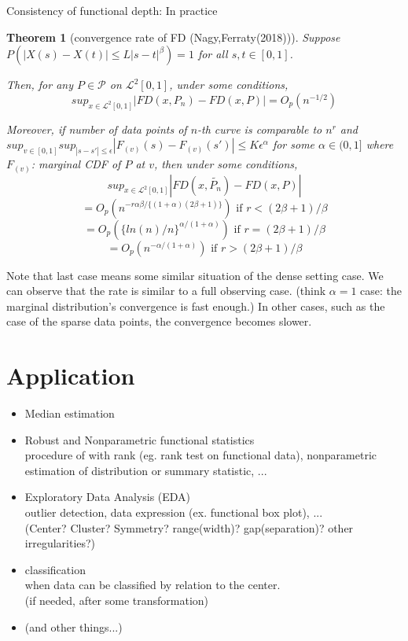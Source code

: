 \documentclass[aspectratio=169,ignorenonframetext,9pt]{beamer}
\theoremstyle{plain}
\newtheorem{thm}{Theorem}[section]
\theoremstyle{definition}
\begin{document}
\begin{frame}{Consistency of functional depth: In practice}
\begin{thm}[convergence rate of FD (Nagy,Ferraty(2018))]
    Suppose $P(|X(s)-X(t)|\leq L|s-t|^\beta)=1$ for all $s,t \in [0,1]$.

    Then, for any $P\in\mathcal{P}$ on $\mathcal{L}^2[0,1]$, under some conditions,
    \[sup_{x\in\mathcal{L}^2[0,1]}|FD(x,P_n)-FD(x,P)|=O_p(n^{-1/2})\]
    
    Moreover, if number of data points of $n$-th curve is comparable to $n^r$ and 
    \(sup_{v\in[0,1]} sup_{|s-s'|\leq \epsilon} |F_{(v)}(s)-F_{(v)}(s')|\leq K\epsilon^\alpha\) for some $\alpha\in(0,1]$
    where $F_{(v)}$: marginal CDF of $P$ at $v$,
    then under some conditions,
    \[sup_{x\in\mathcal{L}^2[0,1]}|FD(x,\tilde{P_n})-FD(x,P)|\]
    \[=O_p(n^{-r\alpha\beta/\{(1+\alpha)(2\beta+1)\}}) \text{ if } r<(2\beta+1)/\beta\]
    \[=O_p(\{ln(n)/n\}^{\alpha/(1+\alpha)}) \text{ if } r=(2\beta+1)/\beta\]
    \[=O_p(n^{-\alpha/(1+\alpha)}) \text{ if } r>(2\beta+1)/\beta\]
\end{thm}
Note that last case means some similar situation of the dense setting case. 
We can observe that the rate is similar to a full observing case.
(think $\alpha=1$ case: the marginal distribution's convergence is fast enough.)
In other cases, such as the case of the sparse data points, the convergence becomes slower.

\end{frame}





\section{Application}
\begin{itemize}
    \item Median estimation
    \item Robust and Nonparametric functional statistics \\
    procedure of with rank (eg. rank test on functional data), nonparametric estimation of distribution or summary statistic, ...
    \item Exploratory Data Analysis (EDA) \\
    outlier detection, data expression (ex. functional box plot), ...\\
    (Center? Cluster? Symmetry? range(width)? gap(separation)? other irregularities?)
    \item classification \\
    when data can be classified by relation to the center. \\
    (if needed, after some transformation)
    \item (and other things...)
\end{itemize}
\end{document}

